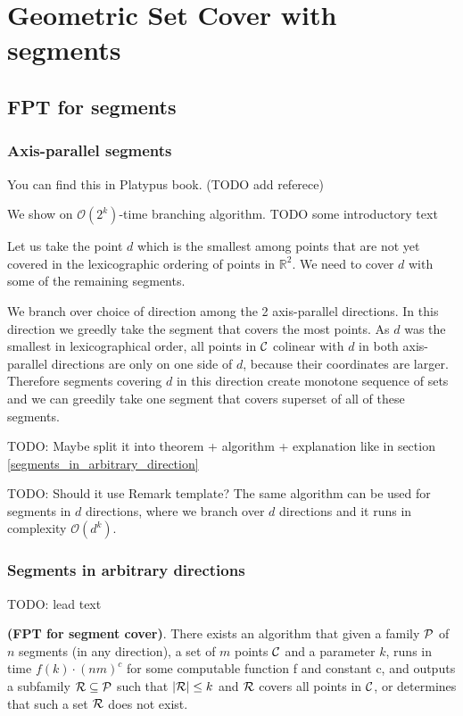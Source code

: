\chapter{Geometric Set Cover with segments}

\section{FPT for segments}
\subsection{Axis-parallel segments}
You can find this in Platypus book. (TODO add referece)

We show on $\mathcal{O}(2^k)$-time branching algorithm.
TODO some introductory text

Let us take
the point $d$ which is the smallest 
among points that are not yet covered
in the lexicographic ordering
of points in $\mathbb{R}^2$.
We need to cover $d$ with some of the remaining segments.

We branch over choice of direction among the 2 axis-parallel directions.
In this direction we greedly take the segment that covers
the most points. As $d$ was the smallest
in lexicographical order, all points in $\mathcal{C}$ colinear with $d$
in both axis-parallel directions 
are only on one side of $d$, because their coordinates are larger.
Therefore
segments covering $d$ in this direction create monotone sequence
of sets and we can greedily take one segment that covers
superset of all of these segments.

TODO: Maybe split it into theorem + algorithm + explanation like in 
section
\ref{segments_in_arbitrary_direction}

TODO: Should it use Remark template?
The same algorithm can be used for segments in $d$ directions,
where we branch over $d$ directions and it runs in complexity $\mathcal{O}(d^k)$.

\subsection{Segments in arbitrary directions}
TODO: lead text

\label{segments_in_arbitrary_direction}
\begin{tw}{
	\label{segment_cover_fpt}
	\textbf{(FPT for segment cover)}.
	There exists an algorithm that given a family $\mathcal{P}$ of
	$n$ segments (in any direction),
	a set of $m$ points $\mathcal{C}$
	and a parameter $k$,
	runs in time $f(k) \cdot (nm)^c$ for some computable function f and constant c,
	and outputs a subfamily $\mathcal{R} \subseteq \mathcal{P}$
	such that $|\mathcal{R}| \le k$ and $\mathcal{R}$ covers all points in $\mathcal{C}$,
	or determines that such a set $\mathcal{R}$ does not exist.
}\end{tw}

